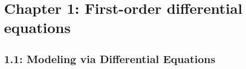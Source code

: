 \documentclass{article}
\begin{document}
\section{Chapter 1: First-order differential equations}

\subsection{1.1: Modeling via Differential Equations}
\end{document}
